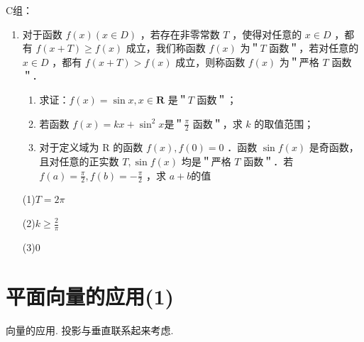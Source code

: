 C组：
\begin{enumerate}
    \item 对于函数 $f(x)(x \in D)$ ，若存在非零常数 $T$ ，使得对任意的 $x \in D$ ，都有 $f(x+T) \geq f(x)$ 成立，我们称函数 $f(x)$ 为＂$T$ 函数＂，若对任意的 $x \in D$ ，都有 $f(x+T)>f(x)$ 成立，则称函数 $f(x)$ 为＂严格 $T$ 函数＂．
    
    \begin{enumerate}
        \item 求证：$f(x)=\sin x, x \in \mathbf{R}$ 是＂$T$ 函数＂；
        \item 若函数 $f(x)=k x+\sin ^2 x$是＂$\frac{\pi}{2}$ 函数＂，求 $k$ 的取值范围；
        \item 对于定义域为 R 的函数 $f(x), f(0)=0$ ．函数 $\sin f(x)$ 是奇函数，且对任意的正实数 $T, \sin f(x)$ 均是＂严格 $T$ 函数＂．若 $f(a)=\frac{\pi}{2}, f(b)=-\frac{\pi}{2}$ ，求 $a+b$的值
    \end{enumerate}

    \begin{jieda}
        (1)$T=2\pi$

        (2)$k\geq\frac{2}{\pi}$

        (3)$0$
    \end{jieda}

    
\end{enumerate}

    





\clearpage
\section*{平面向量的应用(1)}
\zsd 向量的应用. 投影与垂直联系起来考虑. 

